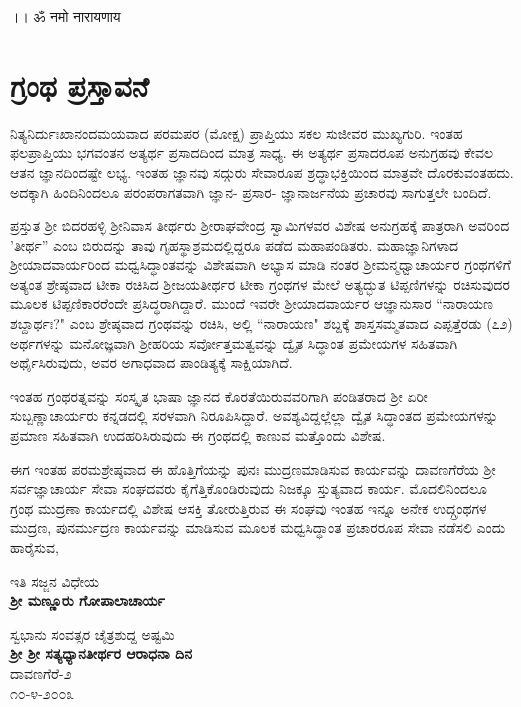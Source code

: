 

\begin{center}
।। ॐ नमो नारायणाय
\end{center}

\chapter*{ಗ್ರಂಥ ಪ್ರಸ್ತಾವನೆ}

ನಿತ್ಯನಿರ್ದುಃಖಾನಂದಮಯವಾದ ಪರಮಪರ (ಮೋಕ್ಷ) ಪ್ರಾಪ್ತಿಯು ಸಕಲ ಸುಜೀವರ ಮುಖ್ಯಗುರಿ. ಇಂತಹ ಫಲಪ್ರಾಪ್ತಿಯು ಭಗವಂತನ ಅತ್ಯರ್ಥ ಪ್ರಸಾದದಿಂದ ಮಾತ್ರ ಸಾಧ್ಯ. ಈ ಅತ್ಯರ್ಥ ಪ್ರಸಾದರೂಪ ಅನುಗ್ರಹವು ಕೇವಲ ಆತನ ಜ್ಞಾನದಿಂದಷ್ಟೇ ಲಭ್ಯ. ಇಂತಹ ಜ್ಞಾನವು ಸದ್ಗುರು ಸೇವಾರೂಪ ಶ್ರದ್ಧಾಭಕ್ತಿಯಿಂದ ಮಾತ್ರವೇ ದೊರಕುವಂತಹದು. ಅದಕ್ಕಾಗಿ ಹಿಂದಿನಿಂದಲೂ ಪರಂಪರಾಗತವಾಗಿ ಜ್ಞಾನ- ಪ್ರಸಾರ- ಜ್ಞಾನಾರ್ಜನೆಯ ಪ್ರಚಾರವು ಸಾಗುತ್ತಲೇ ಬಂದಿದೆ.

ಪ್ರಸ್ತುತ ಶ‍್ರೀ ಬಿದರಹಳ್ಳಿ ಶ‍್ರೀನಿವಾಸ ತೀರ್ಥರು ಶ‍್ರೀರಾಘವೇಂದ್ರ ಸ್ವಾಮಿಗಳವರ ವಿಶೇಷ ಅನುಗ್ರಹಕ್ಕೆ ಪಾತ್ರರಾಗಿ ಅವರಿಂದ 'ತೀರ್ಥ'' ಎಂಬ ಬಿರುದನ್ನು ತಾವು ಗೃಹಸ್ಥಾಶ್ರಮದಲ್ಲಿದ್ದರೂ ಪಡೆದ ಮಹಾಪಂಡಿತರು. ಮಹಾಜ್ಞಾನಿಗಳಾದ ಶ‍್ರೀಯಾದವಾರ್ಯರಿಂದ ಮಧ್ವಸಿದ್ಧಾಂತವನ್ನು ವಿಶೇಷವಾಗಿ ಅಭ್ಯಾಸ ಮಾಡಿ ನಂತರ ಶ‍್ರೀಮನ್ಮಧ್ವಾಚಾರ್ಯರ ಗ್ರಂಥಗಳಿಗೆ ಅತ್ಯಂತ ಶ್ರೇಷ್ಠವಾದ ಟೀಕಾ ರಚಿಸಿದ ಶ‍್ರೀಜಯತೀರ್ಥರ ಟೀಕಾ ಗ್ರಂಥಗಳ ಮೇಲೆ ಅತ್ಯದ್ಭುತ ಟಿಪ್ಪಣಿಗಳನ್ನು ರಚಿಸುವುದರ ಮೂಲಕ ಟಿಪ್ಪಣಿಕಾರರೆಂದೇ ಪ್ರಸಿದ್ಧರಾಗಿದ್ದಾರೆ. ಮುಂದೆ ಇವರೇ ಶ‍್ರೀಯಾದವಾರ್ಯರ ಆಜ್ಞಾನುಸಾರ ``ನಾರಾಯಣ ಶಬ್ದಾರ್ಥಃ?" ಎಂಬ ಶ್ರೇಷ್ಠವಾದ ಗ್ರಂಥವನ್ನು ರಚಿಸಿ, ಅಲ್ಲಿ ``ನಾರಾಯಣ" ಶಬ್ದಕ್ಕೆ ಶಾಸ್ತಸಮ್ಮತವಾದ ಎಪ್ಪತ್ತೆರಡು (೭೨) ಅರ್ಥಗಳನ್ನು ಮನೋಜ್ಞವಾಗಿ ಶ‍್ರೀಹರಿಯ ಸರ್ವೋತ್ತಮತ್ವವನ್ನು ದ್ವೈತ ಸಿದ್ಧಾಂತ ಪ್ರಮೇಯಗಳ ಸಹಿತವಾಗಿ ಅರ್ಥೈಸಿರುವುದು, ಅವರ ಅಗಾಧವಾದ ಪಾಂಡಿತ್ಯಕ್ಕೆ ಸಾಕ್ಷಿಯಾಗಿದೆ.

ಇಂತಹ ಗ್ರಂಥರತ್ನವನ್ನು ಸಂಸ್ಕೃತ ಭಾಷಾ ಜ್ಞಾನದ ಕೊರತೆಯಿರುವವರಿಗಾಗಿ ಪಂಡಿತರಾದ ಶ‍್ರೀ ಏರೀ ಸುಬ್ಬಣ್ಣಾಚಾರ್ಯರು ಕನ್ನಡದಲ್ಲಿ ಸರಳವಾಗಿ ನಿರೂಪಿಸಿದ್ದಾರೆ. ಅವಶ್ಯವಿದ್ದಲ್ಲೆಲ್ಲಾ ದ್ವೈತ ಸಿದ್ಧಾಂತದ ಪ್ರಮೇಯಗಳನ್ನು ಪ್ರಮಾಣ ಸಹಿತವಾಗಿ ಉದಹರಿಸಿರುವುದು ಈ ಗ್ರಂಥದಲ್ಲಿ ಕಾಣುವ ಮತ್ತೊಂದು ವಿಶೇಷ.

ಈಗ ಇಂತಹ ಪರಮಶ್ರೇಷ್ಠವಾದ ಈ ಹೊತ್ತಿಗೆಯನ್ನು ಪುನಃ ಮುದ್ರಣಮಾಡಿಸುವ ಕಾರ್ಯವನ್ನು ದಾವಣಗೆರೆಯ ಶ‍್ರೀ ಸರ್ವಜ್ಞಾಚಾರ್ಯ ಸೇವಾ ಸಂಘದವರು ಕೈಗೆತ್ತಿಕೊಂಡಿರುವುದು ನಿಜಕ್ಕೂ ಸ್ತುತ್ಯವಾದ ಕಾರ್ಯ. ಮೊದಲಿನಿಂದಲೂ ಗ್ರಂಥ ಮುದ್ರಣಾ ಕಾರ್ಯದಲ್ಲಿ ವಿಶೇಷ ಆಸಕ್ತಿ ತೋರುತ್ತಿರುವ ಈ ಸಂಘವು ಇಂತಹ ಇನ್ನೂ ಅನೇಕ ಉದ್ಗ್ರಂಥಗಳ ಮುದ್ರಣ, ಪುನರ್ಮುದ್ರಣ ಕಾರ್ಯವನ್ನು ಮಾಡಿಸುವ ಮೂಲಕ ಮಧ್ವಸಿದ್ಧಾಂತ ಪ್ರಚಾರರೂಪ ಸೇವಾ ನಡೆಸಲಿ ಎಂದು ಹಾರೈಸುವ,

\begin{flushright}
ಇತಿ ಸಜ್ಜನ ವಿಧೇಯ\\\textbf{ಶ‍್ರೀ ಮಣ್ಣೂರು ಗೋಪಾಲಾಚಾರ್ಯ}
\end{flushright}

\noindent
ಸ್ವಭಾನು ಸಂವತ್ಸರ ಚೈತ್ರಶುದ್ದ ಅಷ್ಟಮಿ\\\textbf{ಶ‍್ರೀ ಶ‍್ರೀ ಸತ್ಯಧ್ಯಾನತೀರ್ಥರ ಆರಾಧನಾ ದಿನ}\\ ದಾವಣಗೆರೆ-೨\\ ೧೦-೪-೨೦೦೩

